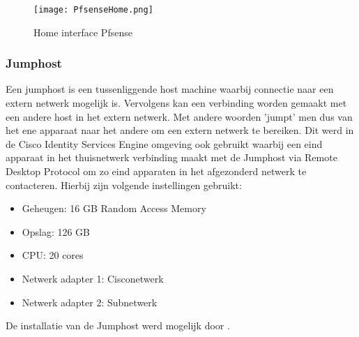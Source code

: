 \begin{figure}[H]
	\centering
	\texttt{[image: PfsenseHome.png]}
	\caption{Home interface Pfsense}
	\label{fig:Pfsense}
\end{figure}

\subsubsection{Jumphost}
Een jumphost is een tussenliggende host machine waarbij connectie naar een extern netwerk mogelijk is. Vervolgens kan een verbinding worden gemaakt met een andere host in het extern netwerk. Met andere woorden 'jumpt' men dus van het ene apparaat naar het andere om een extern netwerk te bereiken. 
\newline
\newline
Dit werd in de Cisco Identity Services Engine omgeving ook gebruikt waarbij een eind apparaat in het thuisnetwerk verbinding maakt met de Jumphost via Remote Desktop Protocol om zo eind apparaten in het afgezonderd netwerk te contacteren. Hierbij zijn volgende instellingen gebruikt:  
 
 
\begin{itemize}
	\item Geheugen: 16 GB Random Access Memory
	\item Opslag: 126 GB
	\item CPU: 20 cores
	\item Netwerk adapter 1: Cisco\textunderscore netwerk
	\item Netwerk adapter 2: Sub\textunderscore netwerk
\end{itemize}

De installatie van de Jumphost werd mogelijk door \cite{Win19_InstallationGuide}. 

